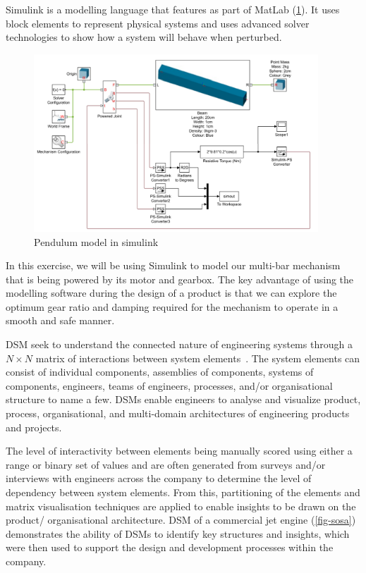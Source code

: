 
Simulink is a modelling language that features as part of MatLab (\cref{fig-simulink}). It uses block elements to represent physical systems and uses advanced solver technologies to show how a system will behave when perturbed.

\begin{figure}[h!]
\centering
\includegraphics[width=0.95\textwidth]{figs/simulink.png}
\caption{Pendulum model in simulink}
\label{fig-simulink}
\end{figure}

In this exercise, we will be using Simulink to model our multi-bar mechanism that is being powered by its motor and gearbox. The key advantage of using the modelling software during the design of a product is that we can explore the optimum gear ratio and damping required for the mechanism to operate in a smooth and safe manner.

\ac{DSM} seek to understand the connected nature of engineering systems through a $N \times N$ matrix of interactions between system elements~\cite{eppinger2012}. The system elements can consist of individual components, assemblies of components, systems of components, engineers, teams of engineers, processes, and/or organisational structure to name a few. \ac{DSM}s enable engineers to analyse and visualize product, process, organisational, and multi-domain architectures of engineering products and projects.


The level of interactivity between elements being manually scored using either a range or binary set of values and are often generated from surveys and/or interviews with engineers across the company to determine the level of dependency between system elements\cite[-8em]{sosa2003}\cite[-2em]{gorbea2008}. 
From this, partitioning of the elements and matrix visualisation techniques are applied to enable insights to be drawn on the product/ organisational architecture. 
\citet{sosa2003} \ac{DSM} of a commercial jet engine (\cref{fig-sosa}) demonstrates the ability of \ac{DSM}s to identify key structures and insights, which were then used to support the design and development processes within the company.

